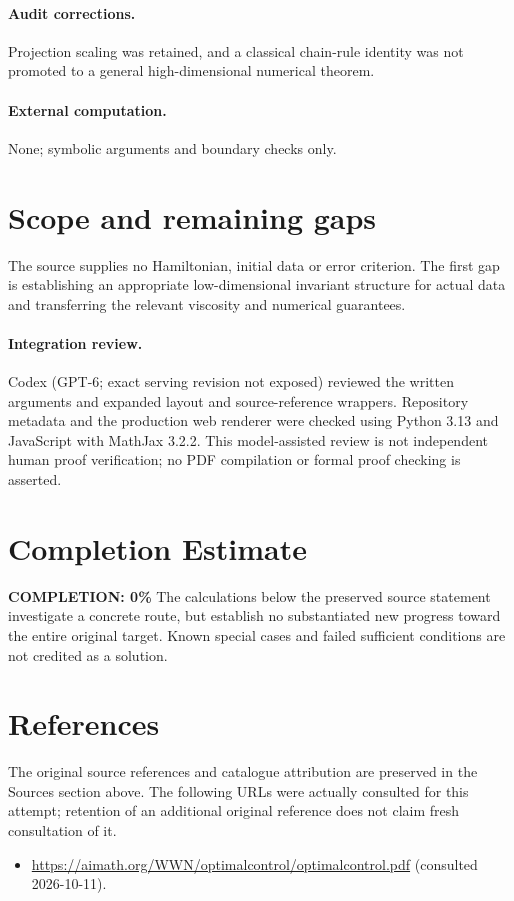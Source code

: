 \documentclass[11pt]{article}
\begin{document}
\paragraph{Audit corrections.} Projection scaling was retained, and a classical chain-rule identity was not promoted to a general high-dimensional numerical theorem.
\paragraph{External computation.} None; symbolic arguments and boundary checks only.
\section{Scope and remaining gaps}
The source supplies no Hamiltonian, initial data or error criterion. The
first gap is establishing an appropriate low-dimensional invariant structure
for actual data and transferring the relevant viscosity and numerical guarantees.
\paragraph{Integration review.} Codex (GPT-6; exact serving revision not exposed) reviewed the written arguments and expanded layout and source-reference wrappers. Repository metadata and the production web renderer were checked using Python 3.13 and JavaScript with MathJax 3.2.2. This model-assisted review is not independent human proof verification; no PDF compilation or formal proof checking is asserted.

\section{Completion Estimate}
\noindent\textbf{COMPLETION: 0\%}
The calculations below the preserved source statement investigate a concrete route,
but establish no substantiated new progress toward the entire original target.
Known special cases and failed sufficient conditions are not credited as a solution.
\section{References}
The original source references and catalogue attribution are preserved in the
Sources section above. The following URLs were actually consulted for this attempt;
retention of an additional original reference does not claim fresh consultation of it.
\begin{itemize}
\item \url{https://aimath.org/WWN/optimalcontrol/optimalcontrol.pdf} (consulted 2026-10-11). 
\end{itemize}
\end{document}
